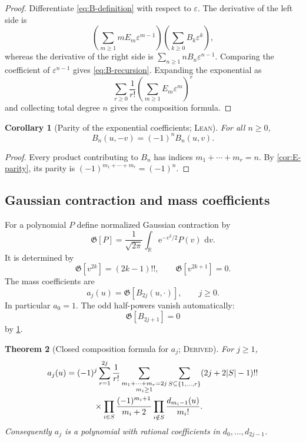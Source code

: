 \documentclass[11pt,oneside]{article}
\newtheorem{theorem}{Theorem}[section]
\newtheorem{corollary}[theorem]{Corollary}
\theoremstyle{definition}
\theoremstyle{remark}
\newcommand{\R}{\mathbb R}
\newcommand{\e}{\mathrm e}
\newcommand{\dd}{\,\mathrm d}
\newcommand{\Gauss}{\mathfrak G}
\newcommand{\Formalized}{\textsc{Lean}}
\newcommand{\Derived}{\textsc{Derived}}
\begin{document}
\begin{proof}
Differentiate \eqref{eq:B-definition} with respect to $\varepsilon$.
The derivative of the left side is
\[
 \left(\sum_{m\geq1}mE_m\varepsilon^{m-1}\right)
 \left(\sum_{k\geq0}B_k\varepsilon^k\right),
\]
whereas the derivative of the right side is
$\sum_{n\geq1}nB_n\varepsilon^{n-1}$.  Comparing the coefficient of
$\varepsilon^{n-1}$ gives \eqref{eq:B-recursion}.  Expanding the
exponential as
\[
 \sum_{r\geq0}\frac1{r!}
 \left(\sum_{m\geq1}E_m\varepsilon^m\right)^r
\]
and collecting total degree $n$ gives the composition formula.
\end{proof}

\begin{corollary}[Parity of the exponential coefficients; \Formalized]
\label{cor:B-parity}
For all $n\geq0$,
\[
 B_n(u,-v)=(-1)^nB_n(u,v).
\]
\end{corollary}

\begin{proof}
Every product contributing to $B_n$ has indices
$m_1+\cdots+m_r=n$.  By \cref{cor:E-parity}, its parity is
$(-1)^{m_1+\cdots+m_r}=(-1)^n$.
\end{proof}

\subsection{Gaussian contraction and mass coefficients}

For a polynomial $P$ define normalized Gaussian contraction by
\[
 \Gauss[P]
 =\frac1{\sqrt{2\pi}}\int_{\R}\e^{-v^2/2}P(v)\,\dd v.
\]
It is determined by
\begin{equation}
 \Gauss[v^{2k}]=(2k-1)!!,\qquad
 \Gauss[v^{2k+1}]=0. \label{eq:gaussian-moments}
\end{equation}
The mass coefficients are
\begin{equation}
 a_j(u)=\Gauss[B_{2j}(u,\cdot)],\qquad j\geq0.
 \label{eq:mass-coeff-definition}
\end{equation}
In particular $a_0=1$.  The odd half-powers vanish automatically:
\[
 \Gauss[B_{2j+1}]=0
\]
by \cref{cor:B-parity}.

\begin{theorem}[Closed composition formula for \(a_j\); \Derived]
\label{thm:mass-composition}
For $j\geq1$,
\begin{align}
 a_j(u)
 ={}&(-1)^j
 \sum_{r=1}^{2j}\frac1{r!}
 \sum_{\substack{m_1+\cdots+m_r=2j\\m_i\geq1}}
 \sum_{S\subseteq\{1,\dots,r\}}
 (2j+2|S|-1)!! \notag\\
 &\qquad{}\times
 \prod_{i\in S}\frac{(-1)^{m_i+1}}{m_i+2}
 \prod_{i\notin S}\frac{d_{m_i-1}(u)}{m_i!}.
 \label{eq:mass-composition}
\end{align}
Consequently $a_j$ is a polynomial with rational coefficients in
$d_0,\dots,d_{2j-1}$.
\end{theorem}
\end{document}
